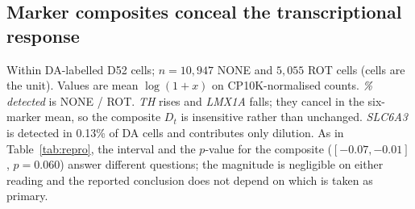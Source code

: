 \documentclass[5p,times,twocolumn]{elsarticle}
\begin{document}
\subsection{\textbf{Marker composites conceal the transcriptional response}}

\begin{table}[!htbp]
  \centering
  \caption{Per-marker decomposition over $\mathcal{G}_D$, with the composite as the final row.}
  \label{tab:markers}
  \begin{minipage}{\linewidth}\footnotesize
  Within DA-labelled D52 cells; $n=10,947$ NONE and $5,055$ ROT cells (cells are the unit). Values are mean $\log(1+x)$ on CP10K-normalised counts. \emph{\% detected} is NONE / ROT. \textit{TH} rises and \textit{LMX1A} falls; they cancel in the six-marker mean, so the composite $D_t$ is insensitive rather than unchanged. \textit{SLC6A3} is detected in 0.13\% of DA cells and contributes only dilution. As in Table~\ref{tab:repro}, the interval and the $p$-value for the composite ($[-0.07,-0.01]$, $p=0.060$) answer different questions; the magnitude is negligible on either reading and the reported conclusion does not depend on which is taken as primary.
  \end{minipage}
\end{table}
\end{document}
